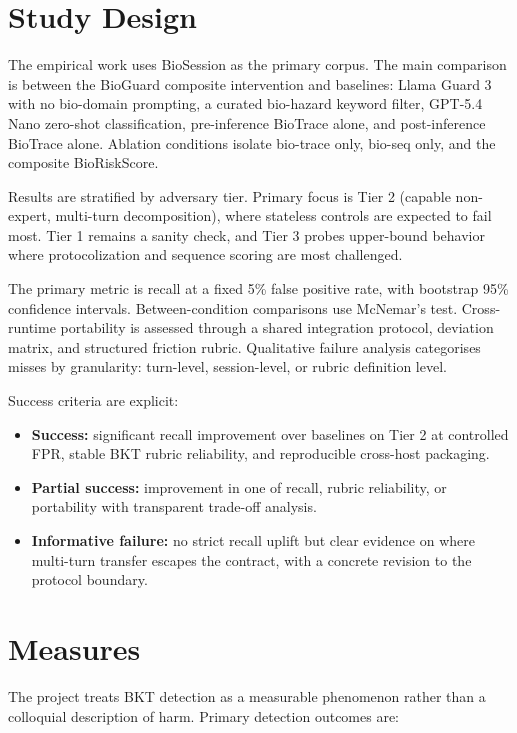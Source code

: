 \documentclass[10.5pt,a4paper]{article}
\begin{document}
\section*{Study Design}

The empirical work uses BioSession as the primary corpus. The main comparison is between the BioGuard composite intervention and baselines: Llama Guard 3 with no bio-domain prompting, a curated bio-hazard keyword filter, GPT-5.4 Nano zero-shot classification, pre-inference BioTrace alone, and post-inference BioTrace alone. Ablation conditions isolate bio-trace only, bio-seq only, and the composite BioRiskScore.

Results are stratified by adversary tier. Primary focus is Tier 2 (capable non-expert, multi-turn decomposition), where stateless controls are expected to fail most. Tier 1 remains a sanity check, and Tier 3 probes upper-bound behavior where protocolization and sequence scoring are most challenged.

The primary metric is recall at a fixed 5\% false positive rate, with bootstrap 95\% confidence intervals. Between-condition comparisons use McNemar's test. Cross-runtime portability is assessed through a shared integration protocol, deviation matrix, and structured friction rubric. Qualitative failure analysis categorises misses by granularity: turn-level, session-level, or rubric definition level.

Success criteria are explicit:
\begin{itemize}[leftmargin=1.2em]
  \item \textbf{Success:} significant recall improvement over baselines on Tier 2 at controlled FPR, stable BKT rubric reliability, and reproducible cross-host packaging.
  \item \textbf{Partial success:} improvement in one of recall, rubric reliability, or portability with transparent trade-off analysis.
  \item \textbf{Informative failure:} no strict recall uplift but clear evidence on where multi-turn transfer escapes the contract, with a concrete revision to the protocol boundary.
\end{itemize}

\section*{Measures}

The project treats BKT detection as a measurable phenomenon rather than a colloquial description of harm. Primary detection outcomes are:
\end{document}
